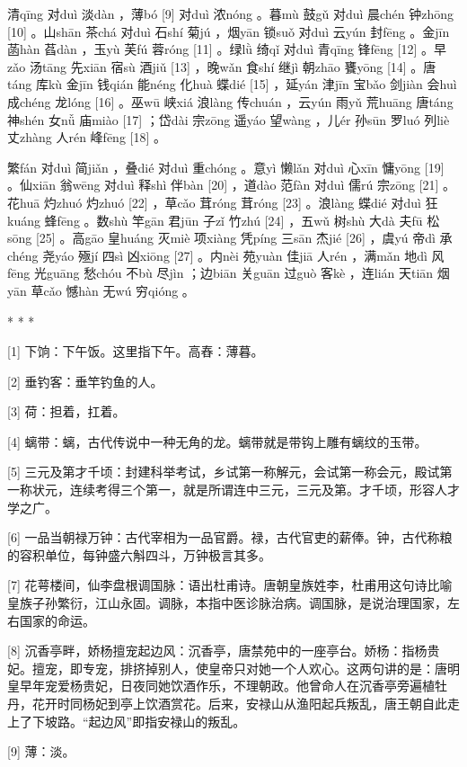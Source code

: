 \documentclass[12pt,UTF8]{ctexbook}
\begin{document}
清qīng 对duì 淡dàn ，薄bó [9] 对duì 浓nóng 。暮mù 鼓gǔ 对duì 晨chén 钟zhōng [10] 。山shān 茶chá 对duì 石shí 菊jú ，烟yān 锁suǒ 对duì 云yún 封fēng 。金jīn 菡hàn 萏dàn ，玉yù 芙fú 蓉róng [11] 。绿lǜ 绮qǐ 对duì 青qīng 锋fēng [12] 。早zǎo 汤tāng 先xiān 宿sù 酒jiǔ [13] ，晚wǎn 食shí 继jì 朝zhāo 饔yōng [14] 。唐táng 库kù 金jīn 钱qián 能néng 化huà 蝶dié [15] ，延yán 津jīn 宝bǎo 剑jiàn 会huì 成chéng 龙lóng [16] 。巫wū 峡xiá 浪làng 传chuán ，云yún 雨yǔ 荒huāng 唐táng 神shén 女nǚ 庙miào [17] ；岱dài 宗zōng 遥yáo 望wàng ，儿ér 孙sūn 罗luó 列liè 丈zhàng 人rén 峰fēng [18] 。

繁fán 对duì 简jiǎn ，叠dié 对duì 重chóng 。意yì 懒lǎn 对duì 心xīn 慵yōng [19] 。仙xiān 翁wēng 对duì 释shì 伴bàn [20] ，道dào 范fàn 对duì 儒rú 宗zōng [21] 。花huā 灼zhuó 灼zhuó [22] ，草cǎo 茸róng 茸róng [23] 。浪làng 蝶dié 对duì 狂kuáng 蜂fēng 。数shù 竿gān 君jūn 子zǐ 竹zhú [24] ，五wǔ 树shù 大dà 夫fū 松sōng [25] 。高gāo 皇huáng 灭miè 项xiàng 凭píng 三sān 杰jié [26] ，虞yú 帝dì 承chéng 尧yáo 殛jí 四sì 凶xiōng [27] 。内nèi 苑yuàn 佳jiā 人rén ，满mǎn 地dì 风fēng 光guāng 愁chóu 不bù 尽jìn ；边biān 关guān 过guò 客kè ，连lián 天tiān 烟yān 草cǎo 憾hàn 无wú 穷qióng 。



* * *



[1] 下饷：下午饭。这里指下午。高舂：薄暮。

[2] 垂钓客：垂竿钓鱼的人。

[3] 荷：担着，扛着。

[4] 螭带：螭，古代传说中一种无角的龙。螭带就是带钩上雕有螭纹的玉带。

[5] 三元及第才千顷：封建科举考试，乡试第一称解元，会试第一称会元，殿试第一称状元，连续考得三个第一，就是所谓连中三元，三元及第。才千顷，形容人才学之广。

[6] 一品当朝禄万钟：古代宰相为一品官爵。禄，古代官吏的薪俸。钟，古代称粮的容积单位，每钟盛六斛四斗，万钟极言其多。

[7] 花萼楼间，仙李盘根调国脉：语出杜甫诗。唐朝皇族姓李，杜甫用这句诗比喻皇族子孙繁衍，江山永固。调脉，本指中医诊脉治病。调国脉，是说治理国家，左右国家的命运。

[8] 沉香亭畔，娇杨擅宠起边风：沉香亭，唐禁苑中的一座亭台。娇杨：指杨贵妃。擅宠，即专宠，排挤掉别人，使皇帝只对她一个人欢心。这两句讲的是：唐明皇早年宠爱杨贵妃，日夜同她饮酒作乐，不理朝政。他曾命人在沉香亭旁遍植牡丹，花开时同杨妃到亭上饮酒赏花。后来，安禄山从渔阳起兵叛乱，唐王朝自此走上了下坡路。“起边风”即指安禄山的叛乱。

[9] 薄：淡。
\end{document}
